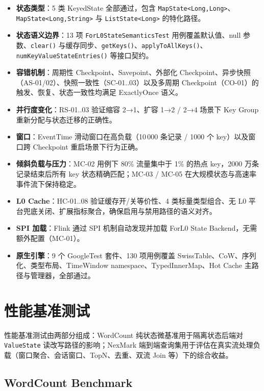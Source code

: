 \documentclass[a4paper,11pt]{article}
\newcommand{\project}{ForL0 State Backend}
\begin{document}
\begin{itemize}
  \item \textbf{状态类型}：5 类 KeyedState 全部通过，包含 \texttt{MapState<Long,Long>}、\texttt{MapState<Long,String>} 与 \texttt{ListState<Long>} 的特化路径。
  \item \textbf{状态语义边界}：13 项 \texttt{ForL0StateSemanticsTest} 用例覆盖默认值、null 参数、\texttt{clear()} 与缓存同步、\texttt{getKeys()}、\texttt{applyToAllKeys()}、\texttt{numKeyValueStateEntries()} 等接口契约。
  \item \textbf{容错机制}：周期性 Checkpoint、Savepoint、外部化 Checkpoint、异步快照（AS-01/02）、快照一致性（SC-01..03）以及多周期 Checkpoint（CO-01）的触发、恢复、状态一致性均满足 ExactlyOnce 语义。
  \item \textbf{并行度变化}：RS-01..03 验证缩容 2→1、扩容 1→2 / 2→4 场景下 Key Group 重新分配与状态迁移的正确性。
  \item \textbf{窗口}：EventTime 滑动窗口在高负载（10\,000 条记录 / 1000 个 key）以及窗口跨 Checkpoint 重启场景下行为正确。
  \item \textbf{倾斜负载与压力}：MC-02 用例下 80\% 流量集中于 1\% 的热点 key，2000 万条记录结束后所有 key 状态精确匹配；MC-03 / MC-05 在大规模状态与高速率事件流下保持稳定。
  \item \textbf{L0 Cache}：HC-01..08 验证缓存开/关等价性、4 类标量类型组合、无 L0 平台兜底关闭、扩展指标聚合，确保启用与禁用路径的语义对齐。
  \item \textbf{SPI 加载}：Flink 通过 SPI 机制自动发现并加载 \project{}，无需额外配置（MC-01）。
  \item \textbf{原生引擎}：9 个 GoogleTest 套件、130 项用例覆盖 SwissTable、CoW、序列化、类型布局、TimeWindow namespace、TypedInnerMap、Hot Cache 主路径与管理器，全部通过。
\end{itemize}

\section{性能基准测试}

性能基准测试由两部分组成：WordCount 纯状态微基准用于隔离状态后端对 \texttt{ValueState} 读改写路径的影响；NexMark 端到端查询集用于评估在真实流处理负载（窗口聚合、会话窗口、TopN、去重、双流 Join 等）下的综合收益。

\subsection{WordCount Benchmark}
\end{document}
